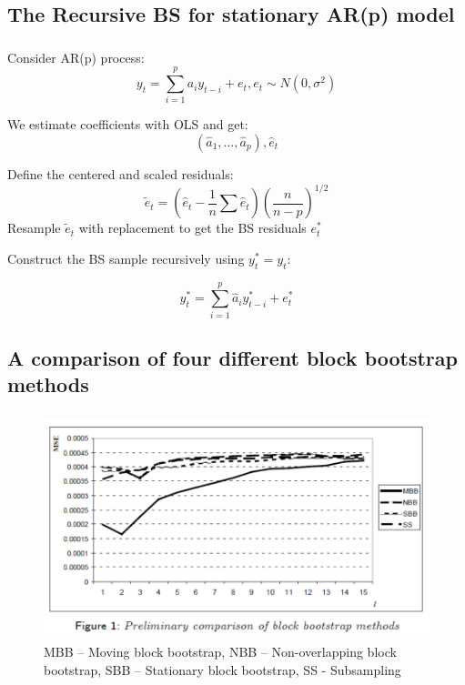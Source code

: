 \documentclass[c, dvipsnames]{beamer}  %
\begin{document}
\subsection{The Recursive BS for stationary AR(p) model}

\begin{frame}[shrink=5]
\frametitle{\insertsection} 
\framesubtitle{\insertsubsection}


Consider AR(p) process:
\[ y_t = \sum_{i=1}^p a_i y_{t-i} + e_t, e_t \sim N(0,\sigma^2)\]

We estimate coefficients with OLS and get: 
\[ (\hat{a}_1,\dots, \hat{a}_p), \hat{e}_t \]




 Define the centered and scaled residuals:
\[ \tilde{e}_t = (\hat{e}_{t} - \frac{1}{n} \sum \hat{e}_{t} )  \left( \frac{n}{n-p}\right) ^{1/2} \]
Resample $ \tilde{e}_t $ with replacement to get the BS residuals $ e_t^* $

Construct the BS sample recursively using $ y_t^* = y_t $:

\[ y_t^* = \sum_{i=1}^p \hat{a}_i y_{t-i}^* + e_t^*\]


\end{frame}


\subsection{A comparison of four different block bootstrap methods}

\begin{frame}[shrink=5]
\frametitle{\insertsection} 
\framesubtitle{\insertsubsection}




\begin{figure}
	\centering
	\includegraphics[width=0.7\linewidth]{screenshot008}
	\caption{MBB – Moving block bootstrap, 
		NBB – Non-overlapping block bootstrap, 
		SBB – Stationary block bootstrap, 
		SS - Subsampling }
	\label{fig:screenshot008}
\end{figure}

\end{frame}
\end{document}
